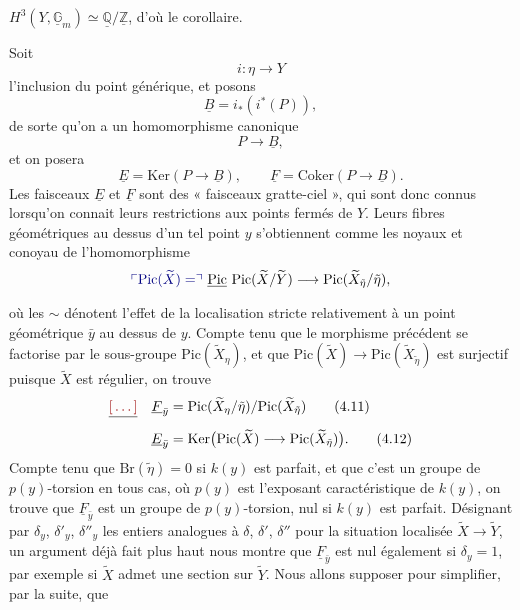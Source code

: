 \documentclass[11pt,a4paper]{article}
\begin{document}

$H^{3}(Y,\underline{\mathbb{G}}_{m}) \simeq \underline{\mathbb{Q}}/
\underline{\mathbb{Z}}$, d'où le corollaire.

Soit \struck{\ill{}}
\[
i : \eta \longrightarrow Y
\]
l'inclusion du point générique, et posons
\[
\underline{B} = i_{*}(i^{*}(P)) ,
\tag{4.8}
\]
de sorte qu'on a un homomorphisme canonique
\[
P \longrightarrow \underline{B} ,
\tag{4.9}
\]
et on posera
\[
\underline{E} = \mathrm{Ker}(P \to \underline{B}) , \qquad
\underline{F} = \mathrm{Coker}(P \to \underline{B}) .
\tag{4.10}
\]
Les faisceaux $\underline{E}$ et $\underline{F}$ sont des « faisceaux
gratte-ciel », qui sont donc connus lorsqu'on connait leurs restrictions aux
points fermés de $Y$. Leurs fibres géométriques au dessus d'un tel point $y$
s'obtiennent comme les noyaux et conoyau de l'homomorphisme
\[
\add{\mathrm{Pic}(\widetilde{X}) =}\ \struck{\mathrm{Pic}}\
\mathrm{Pic}(\widetilde{X}/\widetilde{Y}) \longrightarrow
\mathrm{Pic}(\widetilde{X}_{\tilde{\eta}}/\tilde{\eta}) ,
\]
où les $\sim$ dénotent l'effet de la localisation stricte relativement à un
point géométrique $\bar{y}$ au dessus de $y$. \struck{\ill{}} Compte tenu que
le morphisme précédent se factorise par le sous-groupe
$\mathrm{Pic}(\widetilde{X}_{\eta})$, et que $\mathrm{Pic}(\widetilde{X})
\to \mathrm{Pic}(\widetilde{X}_{\tilde{\eta}})$ est surjectif puisque
$\widetilde{X}$ est régulier, on trouve
\begin{align}
\struck{\ill{}}\quad \underline{F}_{\bar{y}} &=
\mathrm{Pic}(\widetilde{X}_{\eta}/\tilde{\eta}) /
\mathrm{Pic}(\widetilde{X}_{\tilde{\eta}}) \tag{4.11} \\
\underline{E}_{\bar{y}} &= \mathrm{Ker}\bigl(\mathrm{Pic}(\widetilde{X})
\longrightarrow \mathrm{Pic}(\widetilde{X}_{\tilde{\eta}})\bigr) . \tag{4.12}
\end{align}
Compte tenu que $\mathrm{Br}(\tilde{\eta}) = 0$ si $k(y)$ est parfait, et que
c'est un groupe de $p(y)$-torsion en tous cas, où $p(y)$ est l'exposant
caractéristique de $k(y)$, on trouve que $\underline{F}_{\bar{y}}$ est un
groupe de $p(y)$-torsion, nul si $k(y)$ est parfait. Désignant par
$\delta_{y}$, $\delta'_{y}$, $\delta''_{y}$ les entiers analogues à
$\delta$, $\delta'$, $\delta''$ pour la situation localisée $\widetilde{X}
\to \widetilde{Y}$, un argument déjà \struck{\ill{}} fait plus haut nous
montre que $\underline{F}_{\bar{y}}$ \struck{est nul également} est nul
également si $\delta_{y} = 1$, par exemple si $\widetilde{X}$ admet une
section sur $\widetilde{Y}$. Nous allons supposer pour simplifier, par la
suite, que
\end{document}
